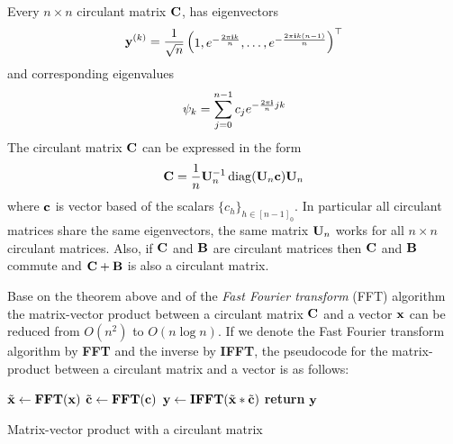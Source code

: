 \begin{theorem}
  Every $n \times n$ circulant matrix $\mathbf{C}$, has eigenvectors  
  \begin{equation}
    \mathbf{y}^{(k)} = \frac{1}{\sqrt{n}} \begin{pmatrix} 1, e^{-\frac{2 \pi \mathbf{i} k}{n}}, \dots, e^{-\frac{2 \pi \mathbf{i} k(n-1)}{n}} \end{pmatrix}^\top
  \end{equation}
  and corresponding eigenvalues
  \begin{equation}
    \psi_k = \sum_{j=0}^{n-1} c_j e^{-\frac{2 \pi \mathbf{i}}{n} jk}
  \end{equation}
  The circulant matrix $\mathbf{C}$ can be expressed in the form 
  \begin{equation}
    \mathbf{C} = \frac{1}{n} \mathbf{U}_n^{-1} \operatorname*{diag}(\mathbf{U}_n \mathbf{c}) \mathbf{U}_n
    \label{equation:ch2-diagonalization_circulant_matrix}
  \end{equation}
  where $\mathbf{c}$ is vector based of the scalars $\{c_h\}_{h \in [n-1]_0}$.
  In particular all circulant matrices share the same eigenvectors, the same matrix $\mathbf{U}_n$ works for all $n \times n$ circulant matrices.
  Also, if $\mathbf{C}$ and $\mathbf{B}$ are circulant matrices then $\mathbf{C}$ and $\mathbf{B}$ commute and $\mathbf{C} + \mathbf{B}$ is also a circulant matrix.
  \label{theorem:ch2-diagonalization_circulant_matrix}
\end{theorem}
\noindent
Base on the theorem above and of the \emph{Fast Fourier transform} (FFT) algorithm the matrix-vector product between a circulant matrix $\mathbf{C}$ and a vector $\mathbf{x}$ can be reduced from $O(n^2)$ to $O(n \log n)$. 
If we denote the Fast Fourier transform algorithm by \textbf{FFT} and the inverse by \textbf{IFFT}, the pseudocode for the matrix-product between a circulant matrix and a vector is as follows:
\begin{algorithm}[h]
  \begin{algorithmic}[1]
     
      \State $\tilde{\mathbf{x}} \gets \textbf{FFT}(\mathbf{x})$
      \State $\tilde{\mathbf{c}} \gets \textbf{FFT}(\mathbf{c})$
      \State $\mathbf{y} \gets \textbf{IFFT}(\tilde{\mathbf{x}} * \tilde{\mathbf{c}})$ 
      \State \textbf{return} $\mathbf{y}$ 
    \EndProcedure
  \end{algorithmic}
  \caption{Matrix-vector product with a circulant matrix}
  \label{algorithm:matrix_vector_product_circulant_matrix}
\end{algorithm}


